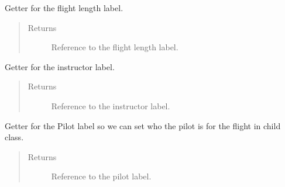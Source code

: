 \documentclass[letterpaper,10pt,english]{sphinxmanual}
\begin{document}
\begin{fulllineitems}
\begin{fulllineitems}
\begin{quote}
\begin{description}
\end{description}\end{quote}

\end{fulllineitems}


\begin{fulllineitems}
\label{\detokenize{index:src.Views.View_ReportScreen.ReportWindow.LblFlightLength}}
Getter for the flight length label.
\begin{quote}\begin{description}
\item[{Returns}] \leavevmode
Reference to the flight length label.

\end{description}\end{quote}

\end{fulllineitems}


\begin{fulllineitems}
\label{\detokenize{index:src.Views.View_ReportScreen.ReportWindow.LblInstructor}}
Getter for the instructor label.
\begin{quote}\begin{description}
\item[{Returns}] \leavevmode
Reference to the instructor label.

\end{description}\end{quote}

\end{fulllineitems}


\begin{fulllineitems}
\label{\detokenize{index:src.Views.View_ReportScreen.ReportWindow.LblPilot}}
Getter for the Pilot label so we can set who the pilot is for the flight in child class.
\begin{quote}\begin{description}
\item[{Returns}] \leavevmode
Reference to the pilot label.


\end{description}
\end{quote}
\end{fulllineitems}
\end{fulllineitems}
\end{document}
